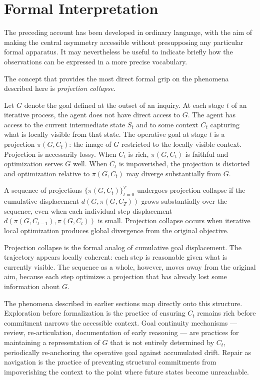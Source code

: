 \section{Formal Interpretation}

The preceding account has been developed in ordinary language, with the aim of
making the central asymmetry accessible without presupposing any particular
formal apparatus. It may nevertheless be useful to indicate briefly how the
observations can be expressed in a more precise vocabulary.

The concept that provides the most direct formal grip on the phenomena described
here is \emph{projection collapse}.

Let $G$ denote the goal defined at the outset of an inquiry. At each stage $t$
of an iterative process, the agent does not have direct access to $G$. The
agent has access to the current intermediate state $S_t$ and to some context
$C_t$ capturing what is locally visible from that state. The operative goal at
stage $t$ is a projection $\pi(G, C_t)$: the image of $G$ restricted to the
locally visible context. Projection is necessarily lossy. When $C_t$ is rich,
$\pi(G, C_t)$ is faithful and optimization serves $G$ well. When $C_t$ is
impoverished, the projection is distorted and optimization relative to
$\pi(G, C_t)$ may diverge substantially from $G$.

\begin{defn}
A sequence of projections $\{\pi(G, C_t)\}_{t=0}^{T}$ undergoes projection
collapse if the cumulative displacement $d(G, \pi(G, C_T))$ grows substantially
over the sequence, even when each individual step displacement
$d(\pi(G, C_{t-1}), \pi(G, C_t))$ is small. Projection collapse occurs when
iterative local optimization produces global divergence from the original objective.
\end{defn}

Projection collapse is the formal analog of cumulative goal displacement. The
trajectory appears locally coherent: each step is reasonable given what is
currently visible. The sequence as a whole, however, moves away from the
original aim, because each step optimizes a projection that has already lost
some information about $G$.

The phenomena described in earlier sections map directly onto this structure.
Exploration before formalization is the practice of ensuring $C_t$ remains
rich before commitment narrows the accessible context. Goal continuity
mechanisms --- review, re-articulation, documentation of early reasoning ---
are practices for maintaining a representation of $G$ that is not entirely
determined by $C_t$, periodically re-anchoring the operative goal against
accumulated drift. Repair as navigation is the practice of preventing structural
commitments from impoverishing the context to the point where future states
become unreachable.

